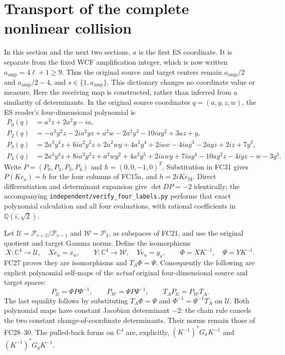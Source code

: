 \documentclass[11pt]{article}
\newcommand{\C}{\mathbb C}
\begin{document}
\section{Transport of the complete nonlinear collision}
In this section and the next two sections, $a$ is the first ES coordinate.
It is separate from the fixed WCF amplification integer, which is now
written $a_{\mathrm{amp}}=4\ell+1\ge9$. Thus the original source and
target centers remain $a_{\mathrm{amp}}/2$ and
$a_{\mathrm{amp}}/2-4$, and $s\in\{1,a_{\mathrm{amp}}\}$.
This dictionary changes no coordinate value or measure.
Here the receiving map is constructed, rather than inferred from a
similarity of determinants. In the original source coordinates
$q=(a,y,z,w)$, the ES reader's four-dimensional polynomial is
\[
\begin{aligned}
 P_0(q)&=a^3z+2a^2y-ia,\\
 P_2(q)&=-a^3y^2z-2ia^2yz+a^2w-2a^2y^3-10iay^2+3az+y,\\
 P_3(q)&=2a^3y^3z+6ia^2y^2z+2a^2wy+4a^2y^4
             +2iaw-4iay^3-2ayz+2iz+7y^2,\\
 P_4(q)&=2a^3y^4z+8ia^2y^3z+a^2wy^2+4a^2y^5
             +2iawy+7iay^4-10ay^2z-4iyz-w-3y^3.
\end{aligned}\tag{FC31}
\]
Write $P=(P_0,P_2,P_3,P_4)$ and $h=(0,0,-1,0)^T$.
Substitution in FC31 gives $P(Ke_a)=h$ for the four columns of FC15a,
and $h=2iKe_{\mathrm M}$. Direct differentiation and determinant
expansion give $\det DP=-2$ identically; the accompanying
\texttt{independent/verify\_four\_labels.py} performs that exact
polynomial calculation and all four evaluations, with rational
coefficients in $\mathbb Q(i,\sqrt2)$.

Let $\mathcal U=\mathcal P_{v+3}/\mathcal P_{v-1}$ and
$\mathcal W=\mathcal P_3$, as subspaces of FC21, and use the original
quotient and target Gamma norms. Define the isomorphisms
\[
 X:\C^4\to\mathcal U,\quad Xe_a=x_a,\qquad
 Y:\C^4\to\mathcal W,\quad Ye_a=y_a,\qquad
 \Phi=XK^{-1},\quad\Psi=YK^{-1}.
 \tag{FC32}
\]
FC27 proves they are isomorphisms and $T_A\Phi=\Psi$.
Consequently the following are explicit polynomial self-maps of the
\emph{actual} original four-dimensional source and target spaces:
\[
 P_{\mathcal U}=\Phi P\Phi^{-1},\qquad
 P_{\mathcal W}=\Psi P\Psi^{-1},\qquad
 T_AP_{\mathcal U}=P_{\mathcal W}T_A.
 \tag{FC33}
\]
The last equality follows by substituting $T_A\Phi=\Psi$ and
$\Phi^{-1}=\Psi^{-1}T_A$ on $\mathcal U$. Both polynomial maps have
constant Jacobian determinant $-2$: the chain rule cancels the two
constant change-of-coordinate determinants. Their norms remain those
of FC28--30. The pulled-back forms on $\C^4$ are, explicitly,
$(K^{-1})^*G_xK^{-1}$ and $(K^{-1})^*G_yK^{-1}$.
\end{document}
